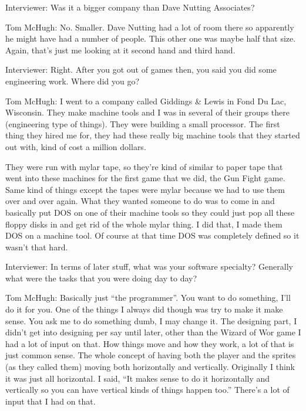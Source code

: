 \textcolor{interviewer}{Interviewer:} Was it a bigger company than Dave Nutting Associates?

\textcolor{interviewee}{Tom McHugh:} No. Smaller. Dave Nutting had a lot of room there so apparently he might have had a number of people. This other one was maybe half that size. Again, that’s just me looking at it second hand and third hand.

\textcolor{interviewer}{Interviewer:} Right. After you got out of games then, you said you did some engineering work. Where did you go?

\textcolor{interviewee}{Tom McHugh:} I went to a company called Giddings \& Lewis in Fond Du Lac, Wisconsin. They make machine tools and I was in several of their groups there (engineering type of things). They were building a small processor. The first thing they hired me for, they had these really big machine tools that they started out with, kind of cost a million dollars.

They were run with mylar tape, so they’re kind of similar to paper tape that went into these machines for the first game that we did, the Gun Fight game. Same kind of things except the tapes were mylar because we had to use them over and over again. What they wanted someone to do was to come in and basically put DOS on one of their machine tools so they could just pop all these floppy disks in and get rid of the whole mylar thing. I did that, I made them DOS on a machine tool. Of course at that time DOS was completely defined so it wasn’t that hard.

\textcolor{interviewer}{Interviewer:} In terms of later stuff, what was your software specialty? Generally what were the tasks that you were doing day to day?

\textcolor{interviewee}{Tom McHugh:} Basically just “the programmer”. You want to do something, I’ll do it for you. One of the things I always did though was try to make it make sense. You ask me to do something dumb, I may change it. The designing part, I didn’t get into designing per say until later, other than the Wizard of Wor game I had a lot of input on that. How things move and how they work, a lot of that is just common sense. The whole concept of having both the player and the sprites (as they called them) moving both horizontally and vertically. Originally I think it was just all horizontal. I said, “It makes sense to do it horizontally and vertically so you can have vertical kinds of things happen too.” There’s a lot of input that I had on that.

